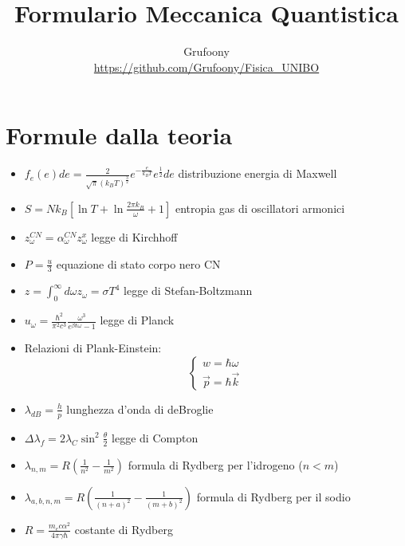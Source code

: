 \documentclass[a4paper]{article}
\begin{document}
	\title{Formulario Meccanica Quantistica}
	\author{Grufoony\\\url{https://github.com/Grufoony/Fisica_UNIBO}}
	\maketitle

    \section{Formule dalla teoria}
        \begin{itemize}
            \item $f_e(e)de=\frac{2}{\sqrt{\pi}(k_BT)^\frac{3}{2}}e^{-\frac{e}{k_BT}}e^{\frac{1}{2}}de$ distribuzione energia di Maxwell
            \item $S=Nk_B\left[\ln T +\ln\frac{2\pi k_B}{\omega}+1\right]$ entropia gas di oscillatori armonici
            \item $z_\omega^{CN}=\alpha_\omega^{CN}z_\omega^{x}$ legge di Kirchhoff
            \item $P=\frac{u}{3}$ equazione di stato corpo nero CN
            \item $z=\int_0^\infty d\omega z_\omega=\sigma T^4$ legge di Stefan-Boltzmann
            \item $u_\omega=\frac{\hbar^2}{\pi^2c^3}\frac{\omega^3}{e^{\beta\hbar\omega}-1}$ legge di Planck
            \item Relazioni di Plank-Einstein:
                    \begin{equation*}
                        \begin{cases}
                            w=\hbar\omega\\
                            \vec{p}=\hbar\vec{k}
                        \end{cases}
                    \end{equation*}
            \item $\lambda_{dB}=\frac{h}{p}$ lunghezza d'onda di deBroglie
            \item $\Delta\lambda_f=2\lambda_C\sin^2\frac{\theta}{2}$ legge di Compton
            \item $\lambda_{n,m}=R\left(\frac{1}{n^2}-\frac{1}{m^2}\right)$ formula di Rydberg per l'idrogeno ($n<m$)
            \item $\lambda_{a,b,n,m}=R\left(\frac{1}{(n+a)^2}-\frac{1}{(m+b)^2}\right)$ formula di Rydberg per il sodio
            \item $R=\frac{m_ec\alpha^2}{4\pi\gamma\hbar}$ costante di Rydberg
        \end{itemize}
    
\end{document}
